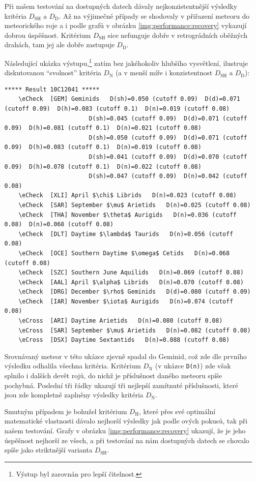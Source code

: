 \smallskip

Při našem testování na dostupných datech dávaly nejkonzistentnější výsledky kritéria $D_\text{SH}$ a $D_\text{D}$. Až na výjimečné případy se shodovaly v přiřazení meteoru do meteorického roje a i podle grafů v obrázku \ref{img:performance:recovery} vykazují dobrou úspěšnost. Kritérium $D_\text{SH}$ sice nefunguje dobře v retrográdních oběžných drahách, tam jej ale dobře zastupuje $D_\text{D}$.

\medskip

Následující ukázka výstupu,\footnote{Výstup byl zarovnán pro lepší čitelnost.} zatím bez jakéhokoliv hlubšího vysvětlení, ilustruje diskutovanou "`svolnost"' kritéria $D_\text{N}$ (a v menší míře i konzistentnost $D_\text{SH}$ a $D_\text{D}$):
\begin{Verbatim}[commandchars=\\\{\},gobble=4,formatcom=\tiny,codes={\catcode`$=3\catcode`^=7},frame=lines]
    ***** Result 10C12041 *****
    \eCheck  [GEM] Geminids   D(sh)=0.050 (cutoff 0.09)  D(d)=0.071 (cutoff 0.09)  D(h)=0.083 (cutoff 0.1)  D(n)=0.019 (cutoff 0.08)
                        D(sh)=0.045 (cutoff 0.09)  D(d)=0.071 (cutoff 0.09)  D(h)=0.081 (cutoff 0.1)  D(n)=0.021 (cutoff 0.08)
                        D(sh)=0.050 (cutoff 0.09)  D(d)=0.071 (cutoff 0.09)  D(h)=0.083 (cutoff 0.1)  D(n)=0.019 (cutoff 0.08)
                        D(sh)=0.041 (cutoff 0.09)  D(d)=0.070 (cutoff 0.09)  D(h)=0.078 (cutoff 0.1)  D(n)=0.022 (cutoff 0.08)
                        D(sh)=0.047 (cutoff 0.09)  D(n)=0.042 (cutoff 0.08)
    \eCheck  [XLI] April $\chi$ Librids   D(n)=0.023 (cutoff 0.08)
    \eCheck  [SAR] September $\mu$ Arietids   D(n)=0.025 (cutoff 0.08)
    \eCheck  [THA] November $\theta$ Aurigids   D(n)=0.036 (cutoff 0.08)  D(n)=0.068 (cutoff 0.08)
    \eCheck  [DLT] Daytime $\lambda$ Taurids   D(n)=0.056 (cutoff 0.08)
    \eCheck  [OCE] Southern Daytime $\omega$ Cetids   D(n)=0.068 (cutoff 0.08)
    \eCheck  [SZC] Southern June Aquilids   D(n)=0.069 (cutoff 0.08)
    \eCheck  [AAL] April $\alpha$ Librids   D(n)=0.070 (cutoff 0.08)
    \eCheck  [DRG] December $\rho$ Geminids   D(d)=0.080 (cutoff 0.09)
    \eCheck  [IAR] November $\iota$ Aurigids   D(n)=0.074 (cutoff 0.08)
    \eCross  [ARI] Daytime Arietids   D(n)=0.080 (cutoff 0.08)
    \eCross  [SAR] September $\mu$ Arietids   D(n)=0.082 (cutoff 0.08)
    \eCross  [DSX] Daytime Sextantids   D(n)=0.088 (cutoff 0.08)
\end{Verbatim}
Srovnávaný meteor v této ukázce zjevně spadal do Geminid, což zde dle prvního výsledku odhalila všechna kritéria. Kritérium $D_\text{N}$ (v ukázce \texttt{D(n)}) zde však splnilo i dalších devět rojů, do nichž je příslušnost daného meteoru spíše pochybná. Poslední tři řádky ukazují tři nejlepší zamítnuté příslušnosti, které jsou zde kompletně zaplněny výsledky kritéria $D_\text{N}$. 

\medskip

Smutným případem je bohužel kritérium $D_\text{H}$, které přes své optimální matematické vlastnosti dávalo nejhorší výsledky jak podle \citeauthor{galligan}ových pokusů, tak při našem testování. Grafy v obrázku \ref{img:performance:recovery} ukazují, že je jeho úspěšnost nejhorší ze všech, a při testování na nám dostupných datech se chovalo spíše jako striktnější varianta $D_\text{SH}$.